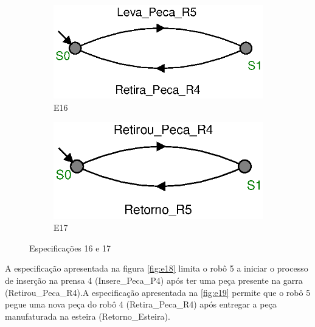 \begin{figure}[H]%
  \centering
  \begin{subfigure}{0.45\textwidth}
      \centering
      \includegraphics[width=\textwidth]{imagens/E16.eps}
      \caption{E16}
      \label{fig:e16}
  \end{subfigure}
  \hfill
  \begin{subfigure}{0.45\textwidth}
      \centering
      \includegraphics[width=\textwidth]{imagens/E17.eps}
      \caption{E17}
      \label{fig:e17}
  \end{subfigure}
  \caption{Especificações 16 e 17}
  \label{fig:e1617}
\end{figure}

A especificação apresentada na figura \ref{fig:e18} limita o robô 5 a iniciar o processo de inserção na prensa 4 (Insere\_Peca\_P4) após ter uma peça presente na garra (Retirou\_Peca\_R4).A especificação apresentada na \ref{fig:e19} permite que o robô 5 pegue uma nova peça do robô 4 (Retira\_Peca\_R4) após entregar a peça manufaturada na esteira (Retorno\_Esteira).

